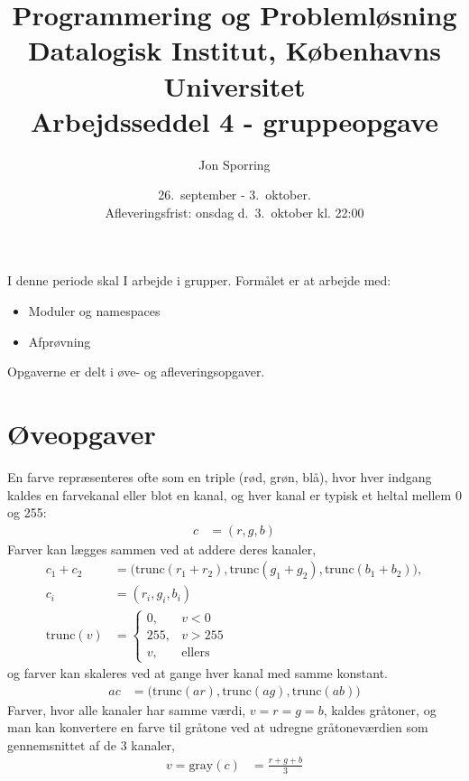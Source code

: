 \documentclass[a4paper,12pt]{article}
\title{Programmering og Problemløsning\\Datalogisk Institut,
  Københavns Universitet\\Arbejdsseddel 4 - gruppeopgave}
\author{Jon Sporring}
\date{26.\ september - 3.\ oktober.\\Afleveringsfrist: onsdag d.\ 3.\ oktober kl. 22:00}
\begin{document}
\maketitle

I denne periode skal I arbejde i grupper. Formålet er at arbejde med:
\begin{itemize}
\item Moduler og namespaces
\item Afprøvning
\end{itemize}
 
Opgaverne er delt i øve- og afleveringsopgaver. 

\section*{Øveopgaver}
En farve repræsenteres ofte som en triple (rød, grøn, blå), hvor hver indgang kaldes en farvekanal eller blot en kanal, og hver kanal er typisk et heltal mellem 0 og 255:
\begin{align}
  c &= (r, g,b)
\end{align}
Farver kan lægges sammen ved at addere deres kanaler,
\begin{align}
  c_1 + c_2 &= \big(\text{trunc}(r_1+r_2), \text{trunc}(g_1+g_2), \text{trunc}(b_1+b_2)\big),
  \\c_i &= (r_i, g_i,b_i)
  \\\text{trunc}(v) &=
  \begin{cases}
    0, &v < 0
    \\255, &v > 255
    \\v, &\text{ellers}
  \end{cases}
\end{align}
og farver kan skaleres ved at gange hver kanal med samme konstant.
\begin{align}
  a c &= \big(\text{trunc}(a r), \text{trunc}(a g), \text{trunc}(a b)\big)
\end{align}
Farver, hvor alle kanaler har samme værdi, $v=r=g=b$, kaldes gråtoner, og man kan konvertere en farve til gråtone ved at udregne gråtoneværdien som gennemsnittet af de 3 kanaler,
\begin{align}
  v = \text{gray}(c) &= \frac{r+g+b}{3}
\end{align}
\end{document}
